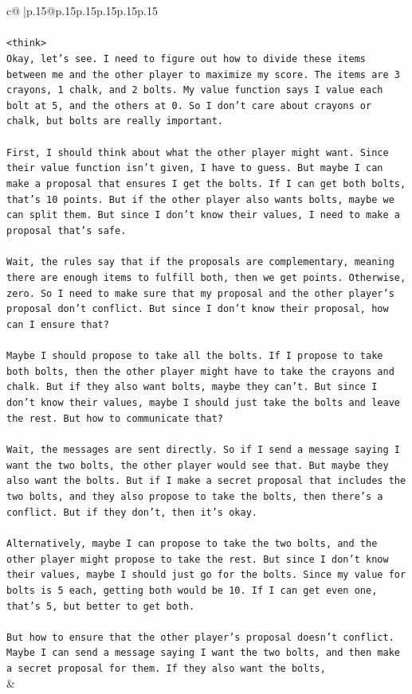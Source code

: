 \documentclass{article}
\begin{document}
{\begin{supertabular}{c@{$\;$}|p{.15\linewidth}@{}p{.15\linewidth}p{.15\linewidth}p{.15\linewidth}p{.15\linewidth}p{.15\linewidth}}
{{{\\ 
\\ 
\texttt{<think>} \\
\texttt{Okay, let's see. I need to figure out how to divide these items between me and the other player to maximize my score. The items are 3 crayons, 1 chalk, and 2 bolts. My value function says I value each bolt at 5, and the others at 0. So I don't care about crayons or chalk, but bolts are really important.} \\
\\ 
\texttt{First, I should think about what the other player might want. Since their value function isn't given, I have to guess. But maybe I can make a proposal that ensures I get the bolts. If I can get both bolts, that's 10 points. But if the other player also wants bolts, maybe we can split them. But since I don't know their values, I need to make a proposal that's safe.} \\
\\ 
\texttt{Wait, the rules say that if the proposals are complementary, meaning there are enough items to fulfill both, then we get points. Otherwise, zero. So I need to make sure that my proposal and the other player's proposal don't conflict. But since I don't know their proposal, how can I ensure that?} \\
\\ 
\texttt{Maybe I should propose to take all the bolts. If I propose to take both bolts, then the other player might have to take the crayons and chalk. But if they also want bolts, maybe they can't. But since I don't know their values, maybe I should just take the bolts and leave the rest. But how to communicate that?} \\
\\ 
\texttt{Wait, the messages are sent directly. So if I send a message saying I want the two bolts, the other player would see that. But maybe they also want the bolts. But if I make a secret proposal that includes the two bolts, and they also propose to take the bolts, then there's a conflict. But if they don't, then it's okay.} \\
\\ 
\texttt{Alternatively, maybe I can propose to take the two bolts, and the other player might propose to take the rest. But since I don't know their values, maybe I should just go for the bolts. Since my value for bolts is 5 each, getting both would be 10. If I can get even one, that's 5, but better to get both.} \\
\\ 
\texttt{But how to ensure that the other player's proposal doesn't conflict. Maybe I can send a message saying I want the two bolts, and then make a secret proposal for them. If they also want the bolts,} \\
            }
        }
    }
    & \\ \\


\end{supertabular}}
\end{document}
